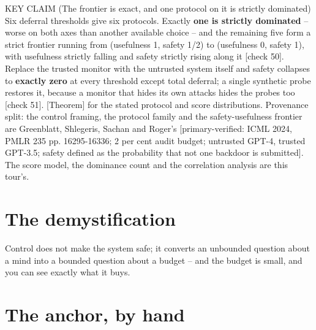 \begin{whybox}{KEY CLAIM (The frontier is exact, and one protocol on it is strictly dominated)}
Six deferral thresholds give six protocols. Exactly \textbf{one is strictly dominated} -- worse on both axes than another available choice -- and the remaining five form a strict frontier running from (usefulness 1, safety 1/2) to (usefulness 0, safety 1), with usefulness strictly falling and safety strictly rising along it [check 50]. Replace the trusted monitor with the untrusted system itself and safety collapses to \textbf{exactly zero} at every threshold except total deferral; a single synthetic probe restores it, because a monitor that hides its own attacks hides the probes too [check 51]. [Theorem] for the stated protocol and score distributions.
Provenance split: the control framing, the protocol family and the safety-usefulness frontier are Greenblatt, Shlegeris, Sachan and Roger's [primary-verified: ICML 2024, PMLR 235 pp. 16295-16336; 2 per cent audit budget; untrusted GPT-4, trusted GPT-3.5; safety defined as the probability that not one backdoor is submitted]. The score model, the dominance count and the correlation analysis are this tour's.
\end{whybox}

\section*{The demystification}

\begin{whyboxnt}
Control does not make the system safe; it converts an unbounded question about a mind into a bounded question about a budget -- and the budget is small, and you can see exactly what it buys.
\end{whyboxnt}

\section*{The anchor, by hand}

